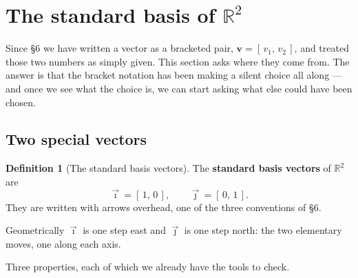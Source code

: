 \documentclass[11pt]{article}
\theoremstyle{definition}
\newtheorem{defn}{Definition}[section]
\theoremstyle{remark}
\newcommand{\R}{\mathbb{R}}
\newcommand{\vc}[1]{\mathbf{#1}}
\newcommand{\ivec}{\vec{\imath}}
\newcommand{\jvec}{\vec{\jmath}}
\newcommand{\lattice}[4]{%
  \draw[step=1cm,gray!25,very thin] (#1,#3) grid (#2,#4);
  \draw[axisline] (#1,0) -- (#2+0.45,0) node[right,font=\scriptsize,black]{$x$};
  \draw[axisline] (0,#3) -- (0,#4+0.45) node[above,font=\scriptsize,black]{$y$};
}
\begin{document}
\section{The standard basis of \texorpdfstring{$\R^{2}$}{R2}}
Since \S6 we have written a vector as a bracketed pair, $\vc{v}=[\,v_1,\,v_2\,]$,
and treated those two numbers as simply given. This section asks where they come
from. The answer is that the bracket notation has been making a silent choice
all along --- and once we see what the choice is, we can start asking what else
could have been chosen.

\subsection{Two special vectors}
\begin{defn}[The standard basis vectors]
The \textbf{standard basis vectors} of $\R^{2}$ are
\[
  \ivec = [\,1,\,0\,],
  \qquad
  \jvec = [\,0,\,1\,] .
\]
They are written with arrows overhead, one of the three conventions of \S6.
\end{defn}

\noindent Geometrically $\ivec$ is one step east and $\jvec$ is one step north:
the two elementary moves, one along each axis.

\begin{center}
\end{center}

\noindent Three properties, each of which we already have the tools to check.
\end{document}
